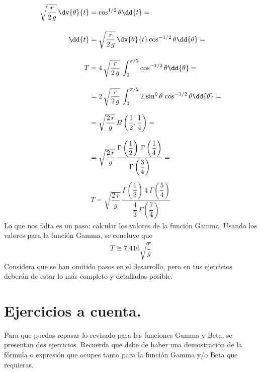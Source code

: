 \begin{align*}
\sqrt{\dfrac{r}{2 \, g}} \, \dv{\theta}{t} &= \cos^{1/2} \theta \dd{t} = \\[1em]
\dd{t} &= \sqrt{\dfrac{r}{2 \, g}} \, \dv{\theta}{t} \cos^{-1/2} \theta \dd{\theta} = \\[1em]
T &= 4 \, \sqrt{\dfrac{r}{2 \, g}} \, \int_{0}^{\pi/2} \cos^{-1/2} \theta \dd{\theta} = \\[1em]
&= 2 \, \sqrt{\dfrac{r}{2 \, g}} \, \int_{0}^{\pi/2} 2 \, \sin^{0} \theta \, \cos^{-1/2} \theta \dd{\theta} = \\[0.8em]
&= \sqrt{\dfrac{2 \, r}{g}} \, B \left( \dfrac{1}{2}, \dfrac{1}{4} \right) = \\[0.8em]
&= \sqrt{\dfrac{2 \, r}{g}} \, \dfrac{\Gamma \left(\dfrac{1}{2} \right) \, \Gamma \left(\dfrac{1}{4} \right)}{\Gamma \left(\dfrac{3}{4} \right)} = 
\end{align*}
\endgroup
\begin{align*}
T = \sqrt{\dfrac{2 \, r}{g}} \, \dfrac{\Gamma \left(\dfrac{1}{2} \right) \, 4 \, \Gamma \left(\dfrac{5}{4} \right)}{\dfrac{4}{3} \, \Gamma \left(\dfrac{7}{4} \right)}
\end{align*}
Lo que nos falta es un paso: calcular los valores de la función Gamma. Usando los valores para la función Gamma, se concluye que
\begin{align*}
T \cong 7.416 \sqrt{\dfrac{r}{g}}
\end{align*}
Considera que se han omitido pasos en el desarrollo, pero en tus ejercicios deberán de estar lo más completo y detallados posible.

\section{Ejercicios a cuenta.}

Para que puedas repasar lo revisado para las funciones Gamma y Beta, se presentan dos ejercicios. Recuerda que debe de haber una demostración de la fórmula o expresión que ocupes tanto para la función Gamma y/o Beta que requieras.

